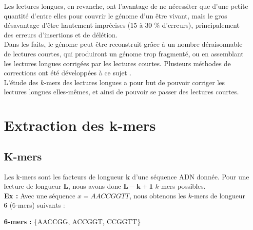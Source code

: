 \documentclass{report}
\begin{document}
    Les lectures longues, en revanche, ont l'avantage de ne nécessiter que d'une petite quantité d'entre elles pour couvrir le génome d'un être vivant, mais le gros désavantage d'être hautement imprécises (15 à 30 \% d'erreurs), principalement des erreurs d'insertions et de délétion.\\

    Dans les faits, le génome peut être reconstruit grâce à un nombre déraisonnable de lectures courtes, qui produiront un génome trop fragmenté, ou en assemblant les lectures longues corrigées par les lectures courtes. Plusieurs méthodes de corrections ont été développées à ce sujet \cite{Morisse2017}.\\

    L'étude des $k$-mers des lectures longues a pour but de pouvoir corriger les lectures longues elles-mêmes, et ainsi de pouvoir se passer des lectures courtes.
    \newpage
  \chapter{Extraction des k-mers}
    \section{K-mers}
      Les k-mers sont les facteurs de longueur $\mathbf{k}$ d'une séquence ADN donnée. Pour une lecture de longueur $\mathbf{L}$, nous avons donc $\mathbf{L - k + 1}$ $k$-mers possibles.\bigskip\\
      \textbf{Ex :} Avec une séquence $x = AACCGGTT$, nous obtenons les $k$-mers de longueur $6$ ($6$-mers) suivants :\\
      \begin{center}\end{center}
      \textbf{6-mers :} \{AACCGG, ACCGGT, CCGGTT\}\bigskip\\
\end{document}

